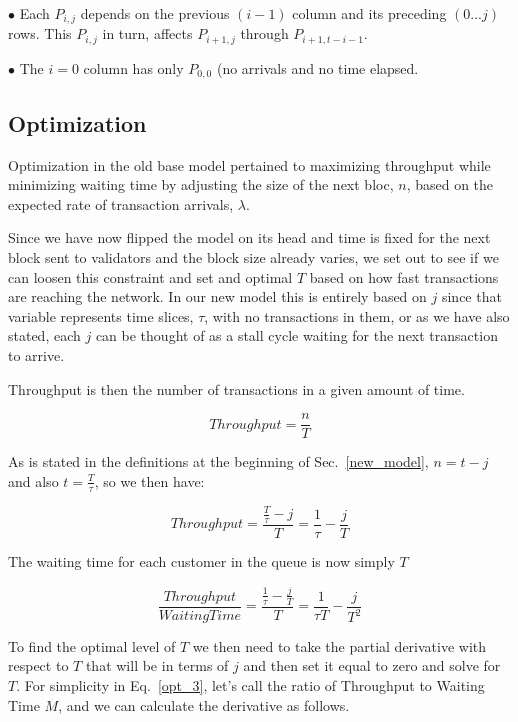 \documentclass[conference]{IEEEtran}
\begin{document}
$\bullet$ Each $P_{i,j}$ depends on the previous $(i-1)$ column and its 
preceding $(0 ... j)$ rows. This $P_{i,j}$ in turn, affects $P_{i+1,j}$ through
$P_{i+1,t-i-1}$.

$\bullet$ The $i=0$ column has only $P_{0,0}$ (no arrivals and no time 
elapsed.

\subsection{Optimization}\label{optimization}

Optimization in the old base model pertained to maximizing throughput
while minimizing waiting time by adjusting the size of the next bloc, $n$,
based on the expected rate of transaction arrivals, $\lambda$. 

Since we have now flipped the model on its head and time is fixed for the next
block sent to validators and the block size already varies, we set out to see if
we can loosen this constraint and set and optimal $T$ based on how fast 
transactions are reaching the network. In our new model this is entirely based
on $j$ since that variable represents time slices, $\tau$, with no transactions in them,
or as we have also stated, each $j$ can be thought of as a stall cycle waiting for
the next transaction to arrive.

Throughput is then the number of transactions in a given amount of time. 

\begin{equation}
  Throughput = \frac{n}{T}\label{opt_1}
\end{equation}

As is stated in the definitions at the beginning of Sec.~\ref{new_model},
$n=t-j$ and also $t = \frac{T}{\tau}$, so we then have:

\begin{equation}
  Throughput = \frac{\frac{T}{\tau}-j}{T}=\frac{1}{\tau}-\frac{j}{T}\label{opt_2}
\end{equation}

The waiting time for each customer in the queue is now simply $T$

\begin{equation}
  \frac{Throughput}{WaitingTime} = \frac{\frac{1}{\tau}-\frac{j}{T}}{T} = \frac{1}{\tau T}-\frac{j}{T^2}\label{opt_2}
\end{equation}

To find the optimal level of $T$ we then need to take the partial derivative with respect to $T$ that will
be in terms of $j$ and then set it equal to zero and solve for $T$. For simplicity in Eq.~\ref{opt_3}, 
let's call the ratio of Throughput to Waiting Time $M$, and we can calculate the derivative as follows.
\end{document}
